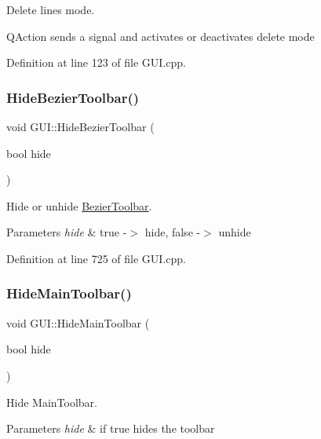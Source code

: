 Delete lines mode. 

Q\+Action sends a signal and activates or deactivates delete mode 

Definition at line 123 of file G\+U\+I.\+cpp.

\mbox{\label{classGUI_ae36c91ff70502eeecb985c3b84aa3a07}} 
\subsubsection{\texorpdfstring{Hide\+Bezier\+Toolbar()}{HideBezierToolbar()}}
{\footnotesize\ttfamily void G\+U\+I\+::\+Hide\+Bezier\+Toolbar (\begin{DoxyParamCaption}\item[{bool}]{hide }\end{DoxyParamCaption})}



Hide or unhide \mbox{\hyperlink{structBezierToolbar}{Bezier\+Toolbar}}. 


\begin{DoxyParams}{Parameters}
{\em hide} & true -\/$>$ hide, false -\/$>$ unhide \\
\hline
\end{DoxyParams}


Definition at line 725 of file G\+U\+I.\+cpp.

\mbox{\label{classGUI_aa115b0163bfbf518dd201f4f02476b75}} 
\subsubsection{\texorpdfstring{Hide\+Main\+Toolbar()}{HideMainToolbar()}}
{\footnotesize\ttfamily void G\+U\+I\+::\+Hide\+Main\+Toolbar (\begin{DoxyParamCaption}\item[{bool}]{hide }\end{DoxyParamCaption})}



Hide Main\+Toolbar. 


\begin{DoxyParams}{Parameters}
{\em hide} & if true hides the toolbar \\
\hline
\end{DoxyParams}


